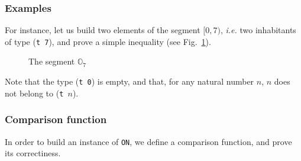 \label{def: Finite-ord-type}



\subsubsection{Examples}

For instance, let us build two elements of the segment $[0, 7)$, \emph{i.e.} two
inhabitants of   type (\texttt{t 7}), and prove a simple  inequality (see Fig.~\ref{fig:O7}).

\begin{figure}[h]
\centering
{}

\caption{The segment $\mathbb{O}_7$\label{fig:O7}}
\end{figure}
  






Note that the type (\texttt{t 0}) is empty, and that, for any natural number
 $n$, $n$ does not belong to (\texttt{t $n$}).


\subsubsection{Comparison function}

In order to build an instance of \texttt{ON}, we define a comparison function,  and prove its correctiness.

\vspace{4pt}





